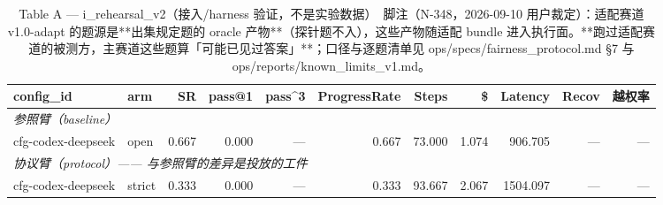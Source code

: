 \begin{table}[t]
\centering
\caption{Table A — i\_rehearsal\_v2（接入/harness 验证，不是实验数据）　脚注（N-348，2026-09-10 用户裁定）：适配赛道 v1.0-adapt 的题源是**出集规定题的 oracle 产物**（探针题不入），这些产物随适配 bundle 进入执行面。**跑过适配赛道的被测方，主赛道这些题算「可能已见过答案」**；口径与逐题清单见 ops/specs/fairness\_protocol.md §7 与 ops/reports/known\_limits\_v1.md。}
\label{tab:a-i_rehearsal_v2}
\begin{tabular}{llrrrrrrrrr}
\toprule
config\_id & arm & SR & pass@1 & pass\^{}3 & ProgressRate & Steps & \$ & Latency & Recov & 越权率 \\
\midrule
\multicolumn{11}{l}{\textit{参照臂（baseline）}} \\
cfg-codex-deepseek & open & 0.667 & 0.000 & --- & 0.667 & 73.000 & 1.074 & 906.705 & --- & --- \\
\midrule
\multicolumn{11}{l}{\textit{协议臂（protocol）—— 与参照臂的差异是投放的工件}} \\
cfg-codex-deepseek & strict & 0.333 & 0.000 & --- & 0.333 & 93.667 & 2.067 & 1504.097 & --- & --- \\
\bottomrule
\end{tabular}
\end{table}

